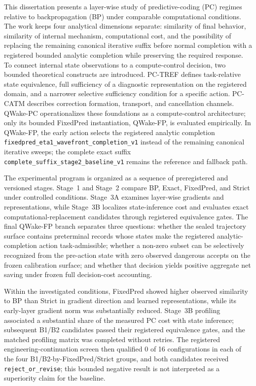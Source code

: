 This dissertation presents a layer-wise study of predictive-coding (PC) regimes
relative to backpropagation (BP) under comparable computational conditions. The work keeps
four analytical dimensions separate: similarity of final behavior, similarity
of internal mechanism, computational cost, and the possibility of replacing the
remaining canonical iterative suffix before normal completion with a registered
bounded analytic completion while preserving the required response. To connect
internal state observations to a compute-control decision, two bounded theoretical
constructs are introduced. PC-TREF defines task-relative state equivalence, full
sufficiency of a diagnostic representation on the registered domain, and a
narrower selective sufficiency condition for a specific action. PC-CATM describes
correction formation, transport, and cancellation channels. QWake-PC operationalizes
these foundations as a compute-control architecture; only its bounded FixedPred
instantiation, QWake-FP, is evaluated empirically. In QWake-FP, the early action
selects the registered analytic completion
\nolinkurl{fixedpred_eta1_wavefront_completion_v1} instead of the remaining
canonical iterative sweeps; the complete exact suffix
\nolinkurl{complete_suffix_stage2_baseline_v1} remains the reference and fallback
path.

The experimental program is organized as a sequence of preregistered and versioned
stages. Stage~1 and Stage~2 compare BP, Exact, FixedPred, and Strict under controlled
conditions. Stage~3A examines layer-wise gradients and representations, while
Stage~3B localizes state-inference cost and evaluates exact computational-replacement
candidates through registered equivalence gates. The final QWake-FP branch separates
three questions: whether the sealed trajectory surface contains preterminal records
whose states make the registered analytic-completion action task-admissible; whether
a non-zero subset can be selectively recognized from the pre-action state with zero
observed dangerous accepts on the frozen calibration surface; and whether that
decision yields positive aggregate net saving under frozen full decision-cost
accounting.

Within the investigated conditions, FixedPred showed higher observed similarity to
BP than Strict in gradient direction and learned representations, while its
early-layer gradient norm was substantially reduced. Stage~3B profiling associated
a substantial share of the measured PC cost with state inference; subsequent B1/B2
candidates passed their registered equivalence gates, and the matched profiling
matrix was completed without retries. The registered engineering-continuation
screen then qualified 0 of 16 configurations in each of the four
B1/B2-by-FixedPred/Strict groups, and both candidates received
\texttt{reject\_or\_revise}; this bounded negative result is not interpreted as a
superiority claim for the baseline.

